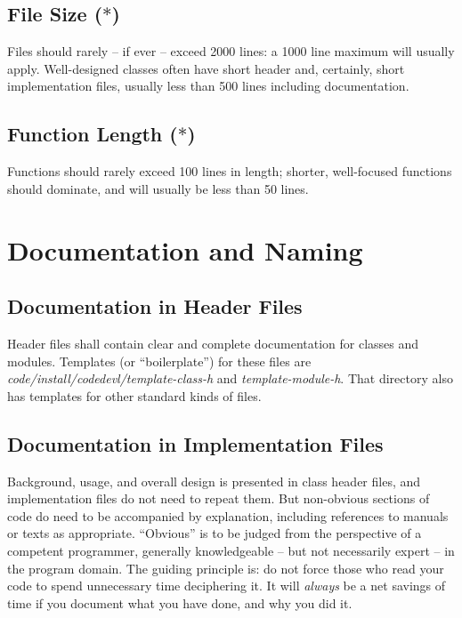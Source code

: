 \subsection {File Size ($\ast$)}
Files should rarely -- if ever -- exceed 2000 lines:  a 1000 line
maximum will usually apply.  Well-designed classes often have short header
and, certainly, short implementation files, usually less than 500 lines
including documentation.
\subsection {Function Length ($\ast$)}
Functions should rarely exceed 100 lines in length; shorter, well-focused
functions should dominate, and will usually be less than 50 lines.
\section {Documentation and Naming}
\subsection {Documentation in Header Files}
Header files shall contain clear and complete documentation for classes and
modules.  Templates (or ``boilerplate'') for these files are 
{\em code/install/codedevl/template-class-h} and {\em template-module-h}.
That directory also has templates for other standard kinds of files.
\subsection {Documentation in Implementation Files}
Background, usage, and overall design is presented in class header files,
and implementation files do not need to repeat them.  But non-obvious
sections of code do need to be accompanied by explanation, including 
references to manuals or texts as appropriate. ``Obvious'' is to be
judged from the perspective of a competent programmer, generally 
knowledgeable -- but not necessarily expert -- in the program domain.  The
guiding principle is:  do not force those who read your code to spend 
unnecessary time deciphering it.  It will {\em always} be a net savings
of time if you document what you have done, and why you did it.
